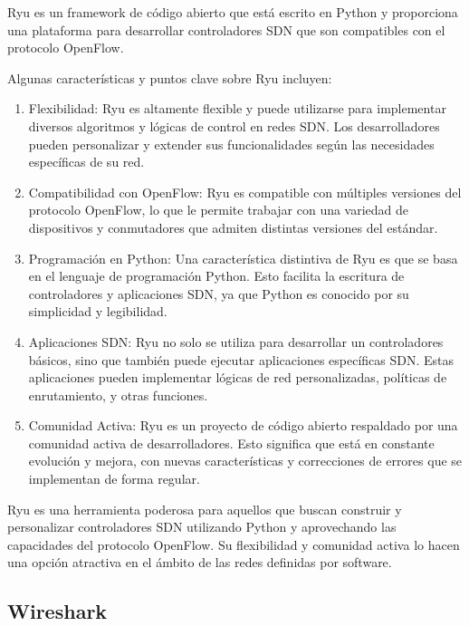 \documentclass[a4paper, 12pt]{book}
\begin{document}
	
	Ryu es un framework de código abierto que está escrito en Python y proporciona una plataforma para desarrollar controladores SDN que son compatibles con el protocolo OpenFlow.
	
	Algunas características y puntos clave sobre Ryu incluyen:
	
	\begin{enumerate}
		
		\item Flexibilidad: Ryu es altamente flexible y puede utilizarse para implementar diversos algoritmos y lógicas de control en redes SDN. Los desarrolladores pueden personalizar y extender sus funcionalidades según las necesidades específicas de su red.
		
		\item Compatibilidad con OpenFlow: Ryu es compatible con múltiples versiones del protocolo OpenFlow, lo que le permite trabajar con una variedad de dispositivos y conmutadores que admiten distintas versiones del estándar.
		
		\item Programación en Python: Una característica distintiva de Ryu es que se basa en el lenguaje de programación Python. Esto facilita la escritura de controladores y aplicaciones SDN, ya que Python es conocido por su simplicidad y legibilidad.
		
		\item Aplicaciones SDN: Ryu no solo se utiliza para desarrollar un controladores básicos, sino que también puede ejecutar aplicaciones específicas SDN. Estas aplicaciones pueden implementar lógicas de red personalizadas, políticas de enrutamiento, y otras funciones.
		
		\item Comunidad Activa: Ryu es un proyecto de código abierto respaldado por una comunidad activa de desarrolladores. Esto significa que está en constante evolución y mejora, con nuevas características y correcciones de errores que se implementan de forma regular.
		
	\end{enumerate}
	
	Ryu es una herramienta poderosa para aquellos que buscan construir y personalizar controladores SDN utilizando Python y aprovechando las capacidades del protocolo OpenFlow. Su flexibilidad y comunidad activa lo hacen una opción atractiva en el ámbito de las redes definidas por software.
	
	\subsection{Wireshark} 
	\label{sec:wireshark}
	
\end{document}
